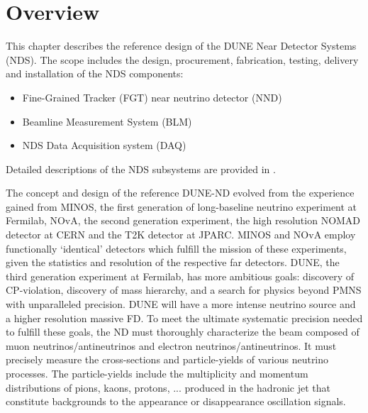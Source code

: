 \section{Overview} %
\label{sec:detectors-nd-ref-ov}

This chapter describes the reference design of the DUNE Near Detector
Systems (NDS). The scope includes the design, procurement,
fabrication, testing, delivery and installation of the NDS components:
\begin{itemize}
\item Fine-Grained Tracker (FGT) near neutrino detector (NND)
\item Beamline Measurement System (BLM)
\item NDS Data Acquisition system (DAQ)  
\end{itemize}
Detailed descriptions of the NDS subsystems are provided in \anxndref. 


The concept and design of the reference DUNE-ND evolved from the
experience gained from MINOS, the first generation of long-baseline
neutrino experiment at Fermilab, NOvA, the second generation
experiment, the high resolution NOMAD detector at CERN and the T2K
detector at JPARC. MINOS and NOvA employ functionally `identical'
detectors which fulfill the mission of these experiments, given the
statistics and resolution of the respective far detectors.  DUNE, the
third generation experiment at Fermilab, has more ambitious goals:
discovery of CP-violation, discovery of mass hierarchy, and a search
for physics beyond PMNS with unparalleled precision. DUNE will have a
more intense neutrino source and a higher resolution massive FD.  To
meet the ultimate systematic precision needed to fulfill these goals,
the ND must thoroughly characterize the beam composed of muon
neutrinos/antineutrinos and electron neutrinos/antineutrinos. It must
precisely measure the cross-sections and particle-yields of various
neutrino processes.  The particle-yields include the multiplicity and
momentum distributions of pions, kaons, protons, ... produced in the
hadronic jet that constitute backgrounds to the appearance or disappearance oscillation signals.

